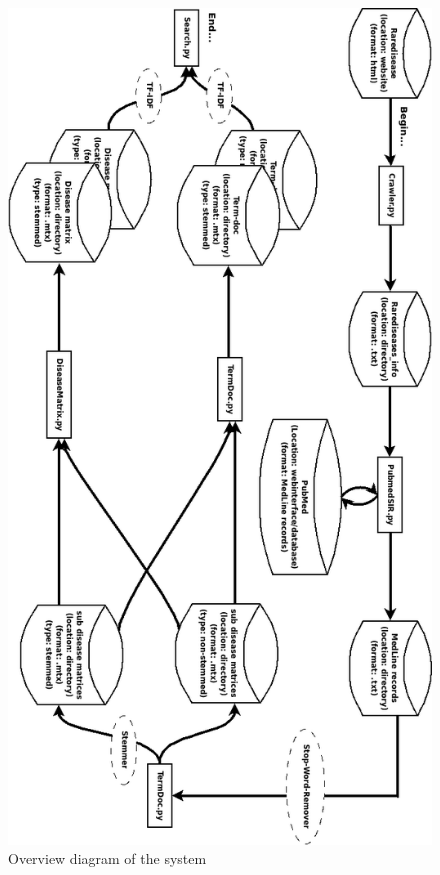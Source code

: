 \begin{figure}[H]
        \begin{center}
          \includegraphics[width=1.0\textwidth]{diagrammer/system_overview_rotate.png}
        \end{center}
        \caption{Overview diagram of the system}
        \label{OverviewDiagram}
\end{figure}

